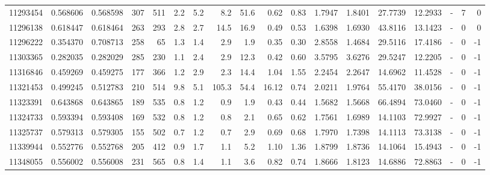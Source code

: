 \begin{tabular}{rrrrrrrrrrrrrrrlrr}
  11293454 & 0.568606 &   0.568598 &  307 &  511 &      2.2 &      5.2 &     8.2 &     51.6 &       0.62 &        0.83 &  1.7947 &  1.8401 &   27.7739 &   12.2933 &             - &        7 &          0 \\
  11296138 & 0.618447 &   0.618464 &  263 &  293 &      2.8 &      2.7 &    14.5 &     16.9 &       0.49 &        0.53 &  1.6398 &  1.6930 &   43.8116 &   13.1423 &             - &        0 &          0 \\
  11296222 & 0.354370 &   0.708713 &  258 &   65 &      1.3 &      1.4 &     2.9 &      1.9 &       0.35 &        0.30 &  2.8558 &  1.4684 &   29.5116 &   17.4186 &             - &        0 &         -1 \\
  11303365 & 0.282035 &   0.282029 &  285 &  230 &      1.1 &      2.4 &     2.9 &     12.3 &       0.42 &        0.60 &  3.5795 &  3.6276 &   29.5247 &   12.2205 &             - &        0 &         -1 \\
  11316846 & 0.459269 &   0.459275 &  177 &  366 &      1.2 &      2.9 &     2.3 &     14.4 &       1.04 &        1.55 &  2.2454 &  2.2647 &   14.6962 &   11.4528 &             - &        0 &         -1 \\
  11321453 & 0.499245 &   0.512783 &  210 &  514 &      9.8 &      5.1 &   105.3 &     54.4 &      16.12 &        0.74 &  2.0211 &  1.9764 &   55.4170 &   38.0156 &             - &        0 &         -1 \\
  11323391 & 0.643868 &   0.643865 &  189 &  535 &      0.8 &      1.2 &     0.9 &      1.9 &       0.43 &        0.44 &  1.5682 &  1.5668 &   66.4894 &   73.0460 &             - &        0 &         -1 \\
  11324733 & 0.593394 &   0.593408 &  169 &  532 &      0.8 &      1.2 &     0.8 &      2.1 &       0.65 &        0.62 &  1.7561 &  1.6989 &   14.1103 &   72.9927 &             - &        0 &         -1 \\
  11325737 & 0.579313 &   0.579305 &  155 &  502 &      0.7 &      1.2 &     0.7 &      2.9 &       0.69 &        0.68 &  1.7970 &  1.7398 &   14.1113 &   73.3138 &             - &        0 &         -1 \\
  11339944 & 0.552776 &   0.552768 &  205 &  412 &      0.9 &      1.7 &     1.1 &      5.2 &       1.10 &        1.36 &  1.8799 &  1.8736 &   14.1064 &   15.4943 &             - &        0 &         -1 \\
  11348055 & 0.556002 &   0.556008 &  231 &  565 &      0.8 &      1.4 &     1.1 &      3.6 &       0.82 &        0.74 &  1.8666 &  1.8123 &   14.6886 &   72.8863 &             - &        0 &         -1 \\

\end{tabular}
